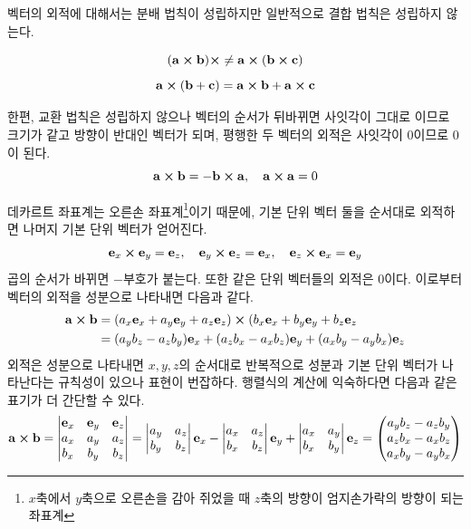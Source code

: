 벡터의 외적에 대해서는 분배 법칙이 성립하지만 일반적으로 결합 법칙은 성립하지 않는다.

\[
  (\vb{a} \cp \vb{b}) \cp \neq \vb{a} \cp (\vb{b} \cp \vb{c})
\]
\[
  \vb{a} \cp (\vb{b} + \vb{c}) = \vb{a} \cp \vb{b} + \vb{a} \cp \vb{c}
\]

한편, 교환 법칙은 성립하지 않으나 벡터의 순서가 뒤바뀌면 사잇각이 그대로 이므로 크기가 같고 방향이 반대인 벡터가 되며, 평행한 두 벡터의 외적은 사잇각이 0이므로 0이 된다.
\[
  \vb{a} \cp \vb{b} = - \vb{b} \cp \vb{a}, \quad \vb{a} \cp \vb{a} = 0
\]

데카르트 좌표계는 오른손 좌표계\footnote{$x$축에서 $y$축으로 오른손을 감아 쥐었을 때 $z$축의 방향이 엄지손가락의 방향이 되는 좌표계}이기 때문에, 기본 단위 벡터 둘을 순서대로 외적하면 나머지 기본 단위 벡터가 얻어진다.
\[
  \vb{e}_x \cp \vb{e}_y = \vb{e}_z, \quad \vb{e}_y \cp \vb{e}_z = \vb{e}_x, \quad \vb{e}_z \cp \vb{e}_x = \vb{e}_y
\]
곱의 순서가 바뀌면 $-$부호가 붙는다. 또한 같은 단위 벡터들의 외적은 0이다. 이로부터 벡터의 외적을 성분으로 나타내면 다음과 같다.
\begin{align*}
  \vb{a} \cp \vb{b} & = (a_x \vb{e}_x + a_y \vb{e}_y + a_z \vb{e}_z) \cp (b_x \vb{e}_x + b_y \vb{e}_y + b_z \vb{e}_z \\
                    & = (a_y b_z - a_z b_y)\vb{e}_x + (a_z b_x - a_x b_z)\vb{e}_y + (a_x b_y - a_y b_x)\vb{e}_z
\end{align*}
외적은 성분으로 나타내면 $x, y, z$의 순서대로 반복적으로 성분과 기본 단위 벡터가 나타난다는 규칙성이 있으나 표현이 번잡하다. 행렬식의 계산에 익숙하다면 다음과 같은 표기가 더 간단할 수 있다.
\[
  \vb{a} \cp \vb{b} = \begin{vmatrix}
    \vb{e}_x & \vb{e}_y & \vb{e}_z \\
    a_x      & a_y      & a_z      \\
    b_x      & b_y      & b_z
  \end{vmatrix} = \begin{vmatrix}
    a_y & a_z \\
    b_y & b_z
  \end{vmatrix} \vb{e}_x - \begin{vmatrix}
    a_x & a_z \\
    b_x & b_z
  \end{vmatrix} \vb{e}_y + \begin{vmatrix}
    a_x & a_y \\
    b_x & b_y
  \end{vmatrix} \vb{e}_z = \begin{pmatrix}
    a_y b_z - a_z b_y \\
    a_z b_x - a_x b_z \\
    a_x b_y - a_y b_x
  \end{pmatrix}
\]


